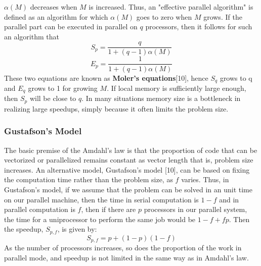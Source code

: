 $\alpha(M)$ decreases when $M$ is increased. Thus, an "effective parallel algorithm" is defined as an algorithm for which $\alpha(M)$ goes to zero when $M$
grows. If the parallel part can be executed in parallel on $q$ processors, then it follows for such an algorithm that 
\begin{equation}
S_{p} = \frac{q}{1+(q-1)\alpha(M)}
\end{equation}	
\begin{equation}
E_{p} = \frac{1}{1+(q-1)\alpha(M)}
\end{equation}	
These two equations are known as {\bf Moler's equations}[10], hence $S_{q}$ grows to q and $E_{q}$ grows to 1 for growing $M$. If local memory is sufficiently
large enough, then $S_{p}$ will be close to $q$. In many situations memory size is a bottleneck in realizing large speedups, simply because it often limits the
problem size.
\subsubsection{Gustafson's Model}
The basic premise of the Amdahl's law is that the proportion of code that can be vectorized or parallelized remains constant as vector length that is, problem
size increases. An alternative model, Gustafson's model [10], can be based on fixing the computation time rather than the problem size, as $f$ varies. Thus, in
Gustafson's model, if we assume that the problem can be solved in an unit time on our parallel machine, then the time in serial computation is $1-f$ and in
parallel computation is $f$, then if there are $p$ processors in our parallel system, the time for a uniprocessor to perform the same job would be $1-f+fp$.
Then the speedup, $S_{p,f}$, is given by:
\begin{equation}
S_{p,f} = p+(1-p)(1-f)
\end{equation}
As the number of processors increases, so does the proportion of the work in parallel mode, and speedup is not limited in the same way as in Amdahl's law.

